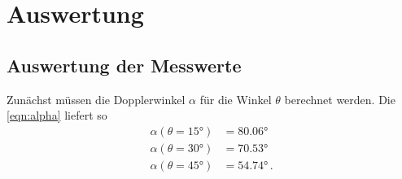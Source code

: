 \section{Auswertung}
\label{sec:Auswertung}


\subsection{Auswertung der Messwerte}
Zunächst müssen die Dopplerwinkel $\alpha$ für die Winkel $\theta$ berechnet werden.
Die \autoref{eqn:alpha} liefert so 
\begin{align*}
     \alpha(\theta =15°) &= 80.06°\\
     \alpha(\theta =30°) &=70.53°\\
     \alpha(\theta =45°) &=54.74°\, .\\
\end{align*}
